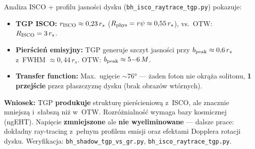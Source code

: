 \begin{remark}
Analiza ISCO + profilu jasno\'sci dysku
(\texttt{bh\_isco\_raytrace\_tgp.py}) pokazuje:
\begin{itemize}[nosep]
  \item \textbf{TGP ISCO:} $r_{\rm ISCO} \approx 0{,}23\,r_s$
    ($R_{\rm phys} = r\psi \approx 0{,}55\,r_s$),
    vs.\ OTW: $R_{\rm ISCO} = 3\,r_s$.
  \item \textbf{Pier\'scie\'n emisyjny:}
    TGP generuje szczyt jasno\'sci przy
    $b_{\rm peak} \approx 0{,}6\,r_s$ z~FWHM $\approx 0{,}44\,r_s$.
    OTW: $b_{\rm peak} \approx 5{-}6\,M$.
  \item \textbf{Transfer function:}
    Max.\ ugięcie $\sim 76°$ --- \.zaden foton nie okr\k{a}\.za
    solitonu, \textbf{1 przej\'scie} przez p\l{}aszczyzn\k{e}
    dysku (brak obraz\'ow wt\'ornych).
\end{itemize}

\textbf{Wniosek:} TGP \textbf{produkuje} struktur\k{e}
pier\'scieniow\k{a} z~ISCO, ale znacznie mniejsz\k{a}
i~s\l{}absz\k{a} ni\.z w~OTW.
Rozr\'o\.znialno\'s\'c wymaga bazy kosmicznej (ngEHT).
Napi\k{e}cie \textbf{zmniejszone} ale \textbf{nie wyeliminowane}
--- dalsze prace:
dok\l{}adny ray-tracing z~pe\l{}nym profilem emisji
oraz efektami Dopplera rotacji dysku.
Weryfikacja: \texttt{bh\_shadow\_tgp\_vs\_gr.py},
\texttt{bh\_isco\_raytrace\_tgp.py}.
\end{remark}
